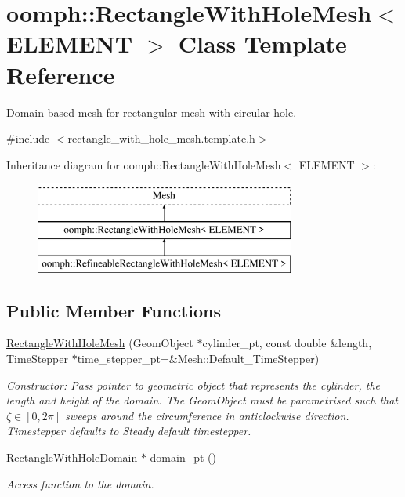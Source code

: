 \hypertarget{classoomph_1_1RectangleWithHoleMesh}{}\section{oomph\+:\+:Rectangle\+With\+Hole\+Mesh$<$ E\+L\+E\+M\+E\+NT $>$ Class Template Reference}
\label{classoomph_1_1RectangleWithHoleMesh}


Domain-\/based mesh for rectangular mesh with circular hole.  




{\ttfamily \#include $<$rectangle\+\_\+with\+\_\+hole\+\_\+mesh.\+template.\+h$>$}

Inheritance diagram for oomph\+:\+:Rectangle\+With\+Hole\+Mesh$<$ E\+L\+E\+M\+E\+NT $>$\+:\begin{figure}[H]
\begin{center}
\leavevmode
\includegraphics[height=3.000000cm]{classoomph_1_1RectangleWithHoleMesh}
\end{center}
\end{figure}
\subsection*{Public Member Functions}
\begin{DoxyCompactItemize}
\item 
\hyperlink{classoomph_1_1RectangleWithHoleMesh_aa5080c0cbd60211cafda6f8d77326eae}{Rectangle\+With\+Hole\+Mesh} (Geom\+Object $\ast$cylinder\+\_\+pt, const double \&length, Time\+Stepper $\ast$time\+\_\+stepper\+\_\+pt=\&Mesh\+::\+Default\+\_\+\+Time\+Stepper)
\begin{DoxyCompactList}\small\item\em Constructor\+: Pass pointer to geometric object that represents the cylinder, the length and height of the domain. The Geom\+Object must be parametrised such that $\zeta \in [0,2\pi]$ sweeps around the circumference in anticlockwise direction. Timestepper defaults to Steady default timestepper. \end{DoxyCompactList}\item 
\hyperlink{classoomph_1_1RectangleWithHoleDomain}{Rectangle\+With\+Hole\+Domain} $\ast$ \hyperlink{classoomph_1_1RectangleWithHoleMesh_a800865b6bb11c07a505245967c0febd0}{domain\+\_\+pt} ()
\begin{DoxyCompactList}\small\item\em Access function to the domain. \end{DoxyCompactList}\end{DoxyCompactItemize}
